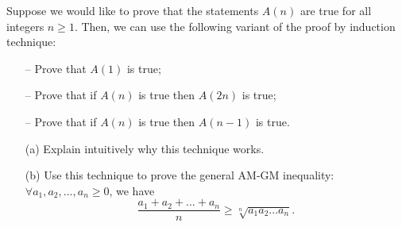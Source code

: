 \begin{problem}
    Suppose we would like to prove that the statements $A(n)$ are true for all integers $n \geqslant 1$. Then, we can use the following variant of the proof by induction technique:
    \begin{itemize}
        \item[--] Prove that $A(1)$ is true;
        \item[--] Prove that if $A(n)$ is true then $A(2n)$ is true;
        \item[--] Prove that if $A(n)$ is true then $A(n-1)$ is true.
    \end{itemize}
    \begin{itemize}
        \item[(a)] Explain intuitively why this technique works.
        \item[(b)]
            Use this technique to prove the general AM-GM inequality: $\forall a_1, a_2, ..., a_n \geqslant 0$, we have
            \[ \frac{a_1 + a_2 + ... + a_n}{n} \geqslant \sqrt[n]{a_1 a_2 ... a_n}. \] 
    \end{itemize}
\end{problem}
